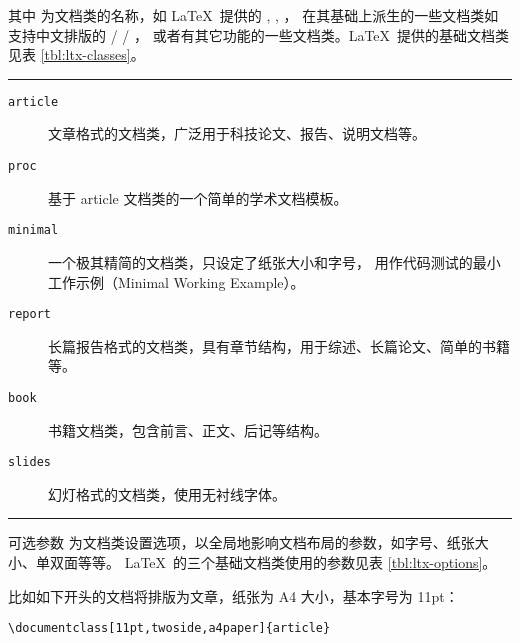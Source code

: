 其中  为文档类的名称，如 \LaTeX\ 提供的 , , ，
在其基础上派生的一些文档类如支持中文排版的  /  / ，
或者有其它功能的一些文档类。\LaTeX\ 提供的基础文档类见表 \ref{tbl:ltx-classes}。

\begin{table}[!hbp]
\caption{\LaTeX\ 提供的基础文档类}\label{tbl:ltx-classes}
\hrule
\begin{flushleft}
\begin{description}
  \item [\normalfont\texttt{article}] 文章格式的文档类，广泛用于科技论文、报告、说明文档等。
  \item [\normalfont\texttt{proc}] 基于 article 文档类的一个简单的学术文档模板。
  \item [\normalfont\texttt{minimal}] 一个极其精简的文档类，只设定了纸张大小和字号，
  用作代码测试的最小工作示例（Minimal Working Example）。
  \item [\normalfont\texttt{report}] 长篇报告格式的文档类，具有章节结构，用于综述、长篇论文、简单的书籍等。
  \item [\normalfont\texttt{book}] 书籍文档类，包含前言、正文、后记等结构。
  \item [\normalfont\texttt{slides}] 幻灯格式的文档类，使用无衬线字体。
\end{description}
\end{flushleft}
\hrule
\end{table}

可选参数  为文档类设置选项，以全局地影响文档布局的参数，如字号、纸张大小、单双面等等。
\LaTeX\ 的三个基础文档类使用的参数见表 \ref{tbl:ltx-options}。

比如如下开头的文档将排版为文章，纸张为 A4 大小，基本字号为 11pt：
\begin{verbatim}
\documentclass[11pt,twoside,a4paper]{article}
\end{verbatim}

